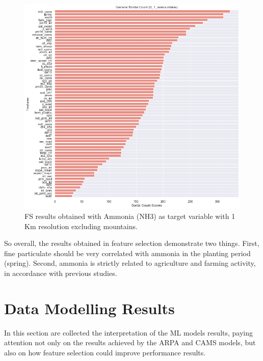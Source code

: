 \bigbreak
\pagebreak
\clearpage
\begin{figure}[H]
\centering
\includegraphics[scale =0.50]{images/tests/0_1_nomountainsnh3_st.png}
\caption{FS results obtained with Ammonia (NH3) as target variable with 1 Km resolution excluding mountains.}
\label{fig:fs_nh3}
\end{figure}
So overall, the results obtained in feature selection demonstrate two things.  
First, fine particulate should be very correlated with ammonia in the planting period (spring). Second, ammonia is strictly related to agriculture and farming activity, in accordance with previous studies.

\section{Data Modelling Results}
In this section are collected the interpretation of the ML models results, paying attention not only on the results achieved by the ARPA and CAMS models, but also on how feature selection could improve performance results. 
